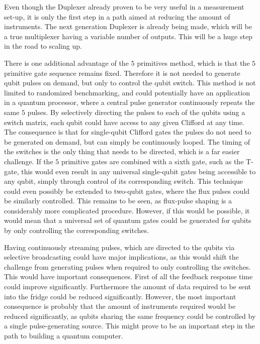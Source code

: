     Even though the Duplexer already proven to be very useful in a measurement set-up, it is only the first step in a path aimed at reducing the amount of instruments. The next generation Duplexer is already being made, which will be a true multiplexer having a variable number of outputs. This will be a huge step in the road to scaling up.

    There is one additional advantage of the $5$ primitives method, which is that the $5$ primitive gate sequence remains fixed. Therefore it is not needed to generate qubit pulses on demand, but only to control the qubit switch. This method is not limited to randomized benchmarking, and could potentially have an application in a quantum processor, where a central pulse generator continuously repeats the same $5$ pulses. By selectively directing the pulses to each of the qubits using a switch matrix, each qubit could have access to any given Clifford at any time. The consequence is that for single-qubit Clifford gates the pulses do not need to be generated on demand, but can simply be continuously looped. The timing of the switches is the only thing that needs to be directed, which is a far easier challenge. If the $5$ primitive gates are combined with a sixth gate, such as the T-gate, this would even result in any universal single-qubit gates being accessible to any qubit, simply through control of its corresponding switch.  This technique could even possibly be extended to two-qubit gates, where the flux pulses could be similarly controlled. This remains to be seen, as flux-pulse shaping is a considerably more complicated procedure. However, if this would be possible, it would mean that a universal set of quantum gates could be generated for qubits by only controlling the corresponding switches.

    Having continuously streaming pulses, which are directed to the qubits via selective broadcasting could have major implications, as this would shift the challenge from generating pulses when required to only controlling the switches. This would have important consequences. First of all the feedback response time could improve significantly. Furthermore the amount of data required to be sent into the fridge could be reduced significantly. However, the most important consequence is probably that the amount of instruments required would be reduced significantly, as qubits sharing the same frequency could be controlled by a single pulse-generating source. This might prove to be an important step in the path to building a quantum computer.